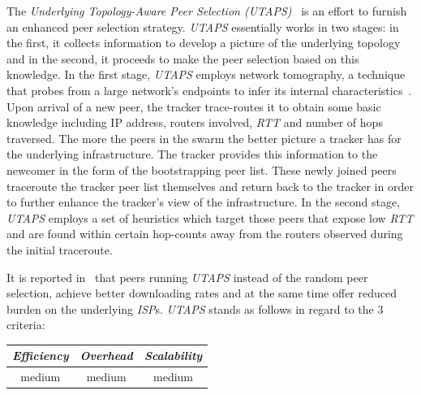 The \emph{Underlying Topology-Aware Peer Selection (UTAPS)}~\cite{LCY2008}
is an effort to furnish an enhanced peer selection strategy. \emph{UTAPS}
essentially works in two stages: in the first,
it collects information to develop a picture of the underlying topology 
and in the second, it proceeds to make the peer selection based on 
this knowledge. In the first stage, \emph{UTAPS} employs
network tomography, a technique that probes from a large network's 
endpoints to infer its internal characteristics~\cite{chny_tomography_2002}. 
Upon arrival of a new peer, the tracker trace-routes 
it to obtain some basic knowledge 
including IP address, routers involved, \emph{RTT} and number of 
hops traversed.
The more the peers in the swarm the better 
picture a tracker has for the underlying infrastructure.  
The tracker provides this information to the newcomer in the form
of the bootstrapping peer list. These newly joined peers traceroute the tracker
peer list themselves and return back to the tracker in order to further enhance
the tracker's view of the infrastructure.
In the second stage, \emph{UTAPS} employs a set of heuristics
which target those peers that expose low \emph{RTT} and are found within
certain hop-counts away from
the routers observed during the initial traceroute.

It is reported in~\cite{LCY2008} that peers running \emph{UTAPS}
instead of the random peer selection, achieve better downloading rates
and at the same time offer reduced burden on the underlying \emph{ISP}s. 
\emph{UTAPS} stands as follows in regard to the $3$ criteria:
\begin{center}
{\footnotesize
\begin{tabular}{ccc}
\emph{Efficiency} & \emph{Overhead} & \emph{Scalability} \\
\hline
medium &
medium &
%
medium
\end{tabular}
}
\end{center}

